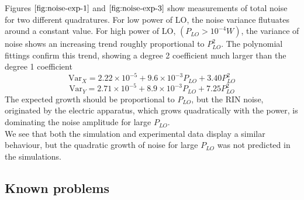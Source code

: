 %
Figures $\ref{fig:noise-exp-1}$ and $\ref{fig:noise-exp-3}$ show measurements of total noise for two different quadratures. For low power of LO, the noise variance flutuates around a constant value. For high power of LO, $(P_{LO}>10^{-4}W)$, the variance of noise shows an increasing trend roughly proportional to $P_{LO}^2$. The polynomial fittings confirm this trend, showing a degree 2 coefficient much larger than the degree 1 coefficient
%
\begin{equation}
\textrm{Var}_X = 2.22 \!\! \times \!\! 10^{-5} + 9.6 \!\! \times \!\! 10^{-3} P_{LO} + 3.40 P_{LO}^2
\end{equation}
\begin{equation}
\textrm{Var}_Y = 2.71 \!\! \times \!\! 10^{-5} + 8.9 \!\! \times \!\! 10^{-3} P_{LO} + 7.25 P_{LO}^2
\end{equation}
%
The expected growth should be proportional to $P_{LO}$, but the RIN noise, originated by the electric apparatus, which grows quadratically with the power, is dominating the noise amplitude for large $P_{LO}$.\\
We see that both the simulation and experimental data display a similar behaviour, but the quadratic growth of noise for large $P_{LO}$ was not predicted in the simulations.\\
%
%
\subsection{Known problems}
%
%

